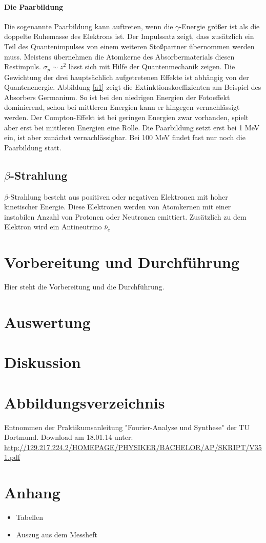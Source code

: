\documentclass[11pt,ngerman,a4paper]{article}
\begin{document}
\paragraph{Die Paarbildung}
Die sogenannte Paarbildung kann auftreten, wenn die $\gamma$-Energie größer ist als die doppelte Ruhemasse des Elektrons ist.
Der Impulssatz zeigt, dass zusätzlich ein Teil des Quantenimpulses von einem weiteren Stoßpartner übernommen werden muss. Meistens übernehmen die Atomkerne des Absorbermaterials diesen Restimpuls. $\sigma_p \sim z^2$ lässt sich mit Hilfe der Quantenmechanik zeigen.
\newline\newline
Die Gewichtung der drei hauptsächlich aufgetretenen Effekte ist abhängig von der Quantenenergie. Abbildung \ref{a1} zeigt die Extinktionskoeffizienten am Beispiel des Absorbers Germanium. So ist bei den niedrigen Energien der Fotoeffekt dominierend, schon bei mittleren Energien kann er hingegen vernachlässigt werden. Der Compton-Effekt ist bei geringen Energien zwar vorhanden, spielt aber erst bei mittleren Energien eine Rolle. Die Paarbildung setzt erst bei 1 MeV ein, ist aber zunächst vernachlässigbar. Bei 100 MeV findet fast nur noch die Paarbildung statt.
\subsection{$\beta$-Strahlung}
$\beta$-Strahlung besteht aus positiven oder negativen Elektronen mit hoher kinetischer Energie. Diese Elektronen werden von Atomkernen mit einer instabilen Anzahl von Protonen oder Neutronen emittiert. Zusätzlich zu dem Elektron wird ein Antineutrino $\overline{\nu}_e$
\section{Vorbereitung und Durchf\"{u}hrung}
Hier steht die Vorbereitung und die Durchführung.

\section{Auswertung}

\section{Diskussion}

\section{Abbildungsverzeichnis}
\begin{enumerate}[{[}1{]}]
\item Entnommen der Praktikumsanleitung "Fourier-Analyse und Synthese" der TU Dortmund. Download am 18.01.14 unter:\\
 \url{http://129.217.224.2/HOMEPAGE/PHYSIKER/BACHELOR/AP/SKRIPT/V351.pdf}
\end{enumerate}
\section{Anhang}
\begin{itemize}
\item Tabellen
\item Auszug aus dem Messheft
\end{itemize}
\end{document}
